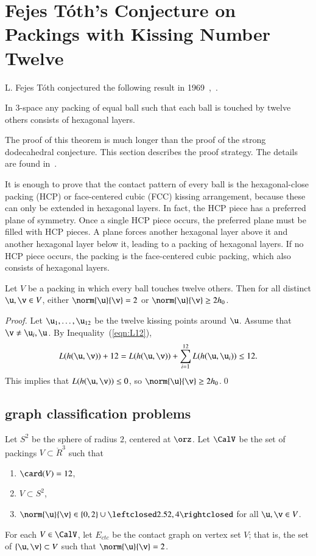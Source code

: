 \documentclass{llncs}
\begin{document}
\section{Fejes T\'oth's Conjecture on Packings with Kissing Number Twelve}


L. Fejes T\'oth conjectured the following result in
1969~\cite{Fejes-Toth:69},~\cite{Fejes-Toth:89}. 

\begin{theorem}
  In $3$-space any packing of equal ball such that each ball is touched
  by twelve others consists of hexagonal layers.
\end{theorem}

The proof of this theorem is much longer than the proof of the strong
dodecahedral conjecture.  This section describes the proof strategy.
The details are found in~\cite{FTK}.

It is enough to prove that the contact pattern of every ball is the
hexagonal-close packing (HCP) or face-centered cubic (FCC) kissing
arrangement, because these can only be extended in hexagonal layers.
In fact, the HCP piece has a preferred plane of symmetry.  Once a
single HCP piece occurs, the preferred plane must be filled with
HCP pieces.  A plane forces another hexagonal layer above it and another
hexagonal layer below it, leading to a packing of hexagonal layers.
If no HCP piece occurs, the packing is the face-centered cubic
packing, which also consists of hexagonal layers.

\begin{lemma} Let $V$ be a packing in which every ball touches twelve
  others.  Then for all distinct $\u,\v\in V$, either
  $\norm{\u}{\v}=2$ or $\norm{\u}{\v}\ge 2h_0$.
\end{lemma}

\begin{proof}
Let $ \u_1,\ldots, \u_{12}$ be the twelve kissing points
  around $\u$.  Assume that $\v\ne \u_i,\u$.  By
  Inequality~(\ref{eqn:L12}),
\[
   L(h( \u, \v))  + 12 
  =  L(h( \u, \v)) + \sum_{i=1}^{12} L(h( \u, \u_i))  \le 12.
\]
This implies that $L(h( \u, \v))\le 0$, so $\norm{ \u}{ \v}\ge 2h_0$.\qed
\end{proof}


\subsection{graph classification problems}

\begin{definition}
  Let $S^2$ be the sphere of radius $2$, centered at $\orz$.  Let
  $\CalV$ be the set of packings $V\subset \ring{R}^3$ such that
\begin{enumerate}
\item $\card(V) = 12$,
\item $V\subset S^2$,
\item $\norm{\u}{\v} \in \{0,2\}\cup
  \leftclosed2.52,4\rightclosed$ for all $\u,\v\in V$.
\end{enumerate}
For each $V\in \CalV$, let $E_{ctc}$ be the contact graph on vertex set $V$;
that is, the set of $\{\u,\v\}\subset V$ such that $\norm{\u}{\v}=2$.
\end{definition}
\end{document}
